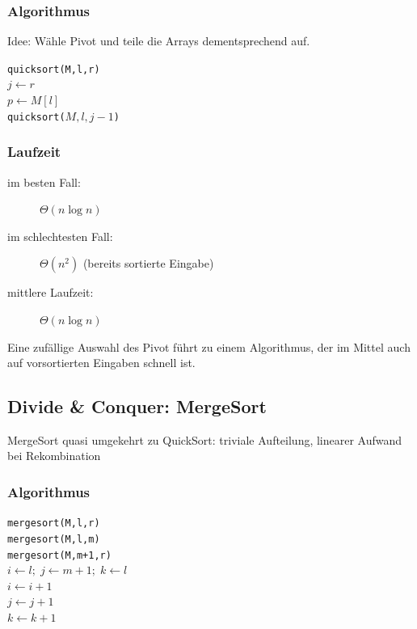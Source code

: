 \documentclass{scrartcl}
\begin{document}
\subsubsection{Algorithmus}
Idee: Wähle Pivot und teile die Arrays dementsprechend auf.
\begin{algorithmic}
\STATE \texttt{quicksort(M,l,r)}
 \\
	{$j \gets r$} \\
	{$p \gets M[l]$}
	\STATE {}
		\ENDWHILE
		\ENDWHILE
		\ENDIF
	\ENDWHILE
	 \\
		\texttt{quicksort($M,l,j-1$)}
	\ENDIF
	\ENDIF
\ENDIF
\end{algorithmic}
\subsubsection{Laufzeit}
\begin{description}
	\item[im besten Fall:] $\Theta(n\log n)$
	\item[im schlechtesten Fall:] $\Theta(n^2)$ {\tiny (bereits sortierte Eingabe)}
	\item[mittlere Laufzeit:] $\Theta(n\log n)$
\end{description}
Eine zufällige Auswahl des Pivot führt zu einem Algorithmus, der im Mittel auch auf vorsortierten Eingaben schnell ist.

\subsection{Divide \& Conquer: MergeSort}
MergeSort quasi umgekehrt zu QuickSort: triviale Aufteilung, linearer Aufwand bei Rekombination
\subsubsection{Algorithmus}
\begin{algorithmic}
\STATE \texttt{mergesort(M,l,r)}
 \\
	\texttt{mergesort(M,l,m)} \\
	\texttt{mergesort(M,m+1,r)} \\
	{$i\gets l;\; j\gets m+1;\; k\gets l$}
	\STATE {}
		 \\
			{$i\gets i+1$}
		\ELSE
		 \\
			$j\gets j+1$
		\ENDIF \\
		{$k \gets k+1$}
	\ENDWHILE
	\ENDFOR
	\ENDFOR
\ENDIF
\end{algorithmic}
\end{document}

